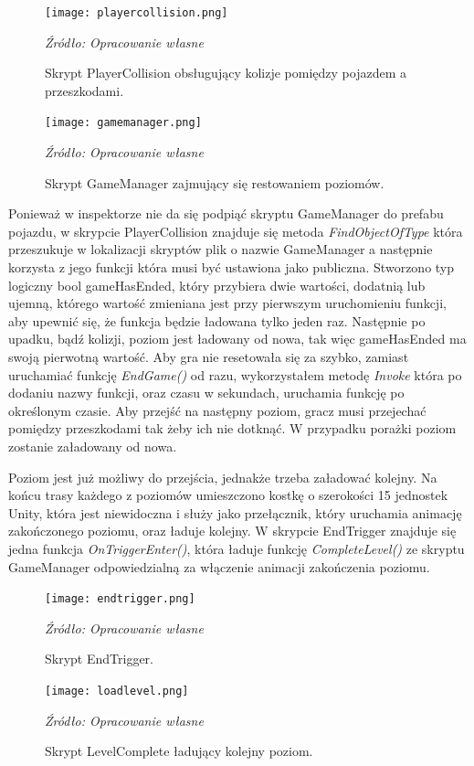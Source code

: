 \begin{figure}[!hbt]
\centering
  \texttt{[image: playercollision.png]}
  \caption{Skrypt PlayerCollision obsługujący kolizje pomiędzy pojazdem a przeszkodami.}\label{rys_7}
  \begin{minipage}[t]{0.75\linewidth}
    \emph{Źródło: Opracowanie własne}
  \end{minipage}
\end{figure}
\begin{figure}[!hbt]
\centering
  \texttt{[image: gamemanager.png]}
  \caption{Skrypt GameManager zajmujący się restowaniem poziomów.}\label{rys_8}
  \begin{minipage}[t]{0.75\linewidth}
    \emph{Źródło: Opracowanie własne}
  \end{minipage}
\end{figure}

\newpage
\indent Ponieważ w inspektorze nie da się podpiąć skryptu GameManager do prefabu pojazdu, w skrypcie PlayerCollision znajduje się metoda \textit{FindObjectOfType} która przeszukuje w lokalizacji skryptów plik o nazwie GameManager a następnie korzysta z jego funkcji która musi być ustawiona jako publiczna. Stworzono typ logiczny bool gameHasEnded, który przybiera dwie wartości, dodatnią lub ujemną, którego wartość zmieniana jest przy pierwszym uruchomieniu funkcji, aby upewnić się, że funkcja będzie ładowana tylko jeden raz. Następnie po upadku, bądź kolizji, poziom jest ładowany od nowa, tak więc gameHasEnded ma swoją pierwotną wartość. Aby gra nie resetowała się za szybko, zamiast uruchamiać funkcję \textit{EndGame()} od razu, wykorzystałem metodę \textit{Invoke} która po dodaniu nazwy funkcji, oraz czasu w sekundach, uruchamia funkcję po określonym czasie. Aby przejść na następny poziom, gracz musi przejechać pomiędzy przeszkodami tak żeby ich nie dotknąć. W przypadku porażki poziom zostanie załadowany od nowa.

\indent Poziom jest już możliwy do przejścia, jednakże trzeba załadować kolejny. Na końcu trasy każdego z poziomów umieszczono kostkę o szerokości 15 jednostek Unity, która jest niewidoczna i służy jako przełącznik, który uruchamia animację zakończonego poziomu, oraz ładuje kolejny. W skrypcie EndTrigger znajduje się jedna funkcja \textit{OnTriggerEnter()}, która ładuje funkcję \textit{CompleteLevel()} ze skryptu GameManager odpowiedzialną za włączenie animacji zakończenia poziomu.

\begin{figure}[!ht]
\centering
  \texttt{[image: endtrigger.png]}
  \caption{Skrypt EndTrigger.}\label{rys_9}
  \begin{minipage}[t]{0.75\linewidth}
    \emph{Źródło: Opracowanie własne}
  \end{minipage}
\end{figure}

\begin{figure}[!h]
\centering
  \texttt{[image: loadlevel.png]}
  \caption{Skrypt LevelComplete ładujący kolejny poziom.}\label{rys_10}
  \begin{minipage}[t]{0.75\linewidth}
    \emph{Źródło: Opracowanie własne}
  \end{minipage}
\end{figure}

